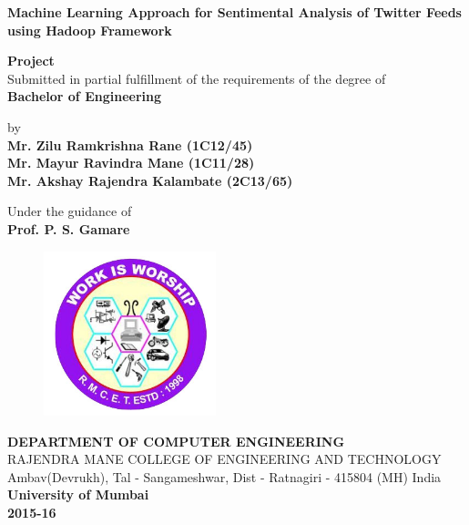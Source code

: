 \documentclass[a4paper,12pt]{report}
\def\baselinestretch{1.5}
\begin{document}
\begin{titlepage}


\thisfancypage{%
\setlength{\fboxsep}{12pt}\doublebox}{}

\begin{center}
\def\baselinestretch{1}
\huge \bf{Machine Learning Approach for
Sentimental Analysis of Twitter Feeds
using Hadoop Framework}
\end{center}
\vfill
\begin{center}
{\bf Project}\\
Submitted in partial fulfillment of the requirements
of the degree of\\
     \Huge \bf {Bachelor of Engineering}
\end{center}
\begin{center}
\large by\\
{\bf {Mr. Zilu Ramkrishna Rane (1C12/45)\\
Mr. Mayur Ravindra Mane (1C11/28)\\
Mr. Akshay Rajendra Kalambate (2C13/65)\\}}
\end{center}
\vfil
\begin{center}
\large 
Under the guidance of\\
{\bf {Prof. P. S. Gamare}}
\end{center}
\vfill
\begin{figure}[h]
\begin{center}
\includegraphics [width=5cm] {images/clogo.jpg}\\
\end{center}
\end{figure}
\begin{center}
\def\baselinestretch{1}
 \Large {\textsc  \bf {DEPARTMENT OF COMPUTER ENGINEERING}} \\
\large 	RAJENDRA MANE COLLEGE OF ENGINEERING AND TECHNOLOGY
Ambav(Devrukh), Tal - Sangameshwar, Dist - Ratnagiri - 415804 (MH) India\\ \bf{University of Mumbai\\2015-16} \\
\end{center}
\end{titlepage}
\end{document}
